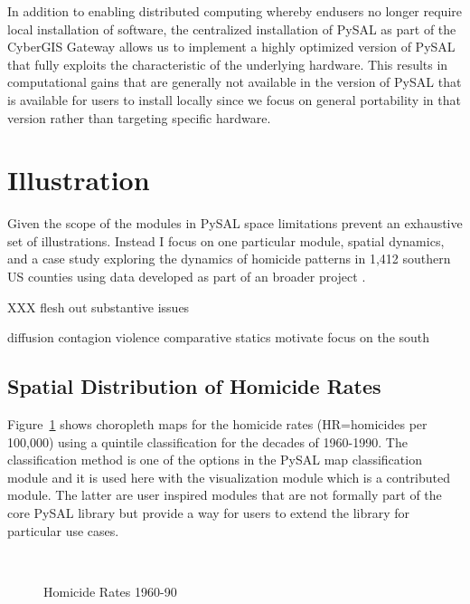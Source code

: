 \documentclass[11pt, titlepage]{article}
\begin{document}
In addition to enabling distributed computing whereby endusers no longer
require local installation of software, the centralized installation of
PySAL as part of the CyberGIS Gateway allows us to implement a highly
optimized version of PySAL that fully exploits the characteristic of the
underlying hardware. This results in computational gains that are
generally not available in the version of PySAL that is available for
users to install locally since we focus on general portability in that
version rather than targeting specific hardware. 


\section{Illustration}

Given the scope of the modules in PySAL space limitations prevent an
exhaustive set of illustrations. Instead I focus on one particular
module, spatial dynamics, and a case study exploring the dynamics of
homicide patterns in  1,412 southern US counties using data developed as part of an
broader project \citep{Baller:2001aa, Messner:1999xz}.

XXX flesh out substantive issues

diffusion
contagion
violence
comparative statics
motivate focus on the south

\subsection{Spatial Distribution of Homicide Rates}

Figure~\ref{f:hr} shows choropleth maps for the homicide rates
(HR=homicides per 100,000) using a quintile classification for the
decades of 1960-1990. The classification method is one of the options in
the PySAL map classification module and it is used here with the
visualization module which is a contributed module. The latter are user
inspired modules that are not formally part of the core PySAL library
but provide a way for users to extend the library for particular use
cases.


\begin{figure}
  \centering
  \\
  \noindent
\caption[caption]{Homicide Rates 1960-90}
\label{f:hr}
\end{figure}
\end{document}
